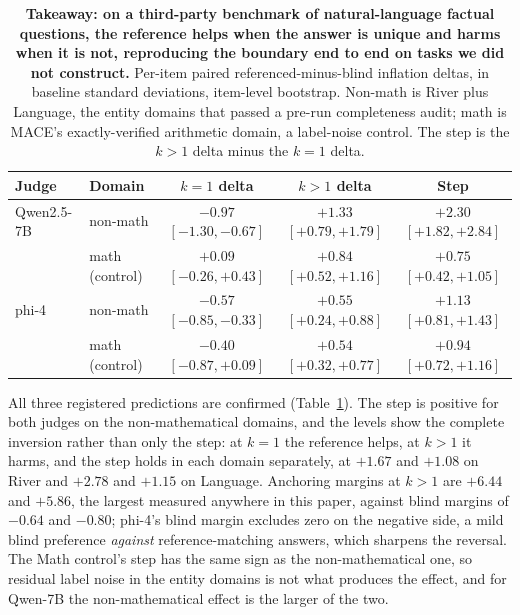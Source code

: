 \documentclass[11pt]{article}
\begin{document}
\begin{table}[tbp]
\centering
\small
\setlength{\tabcolsep}{5pt}
\begin{tabular}{llccc}
\toprule
Judge & Domain & $k{=}1$ delta & $k{>}1$ delta & Step \\
\midrule
Qwen2.5-7B & non-math & $\mathbf{-0.97}$ {\scriptsize$[-1.30,-0.67]$} & $\mathbf{+1.33}$ {\scriptsize$[+0.79,+1.79]$} & $\mathbf{+2.30}$ {\scriptsize$[+1.82,+2.84]$} \\
 & math (control) & $+0.09$ {\scriptsize$[-0.26,+0.43]$} & $+0.84$ {\scriptsize$[+0.52,+1.16]$} & $+0.75$ {\scriptsize$[+0.42,+1.05]$} \\
\addlinespace
phi-4 & non-math & $\mathbf{-0.57}$ {\scriptsize$[-0.85,-0.33]$} & $\mathbf{+0.55}$ {\scriptsize$[+0.24,+0.88]$} & $\mathbf{+1.13}$ {\scriptsize$[+0.81,+1.43]$} \\
 & math (control) & $-0.40$ {\scriptsize$[-0.87,+0.09]$} & $+0.54$ {\scriptsize$[+0.32,+0.77]$} & $+0.94$ {\scriptsize$[+0.72,+1.16]$} \\
\bottomrule
\end{tabular}
\caption{\textbf{Takeaway: on a third-party benchmark of natural-language factual questions, the reference helps when the answer is unique and harms when it is not, reproducing the boundary end to end on tasks we did not construct.}
Per-item paired referenced-minus-blind inflation deltas, in baseline standard deviations, item-level bootstrap. Non-math is River plus Language, the entity domains that passed a pre-run completeness audit; math is \textsc{MACE}'s exactly-verified arithmetic domain, a label-noise control. The step is the $k{>}1$ delta minus the $k{=}1$ delta.}
\label{tab:mace}
\end{table}

All three registered predictions are confirmed (Table~\ref{tab:mace}).
The step is positive for both judges on the non-mathematical domains, and the levels show the complete inversion rather than only the step: at $k{=}1$ the reference helps, at $k{>}1$ it harms, and the step holds in each domain separately, at $+1.67$ and $+1.08$ on River and $+2.78$ and $+1.15$ on Language.
Anchoring margins at $k{>}1$ are $+6.44$ and $+5.86$, the largest measured anywhere in this paper, against blind margins of $-0.64$ and $-0.80$; phi-4's blind margin excludes zero on the negative side, a mild blind preference \emph{against} reference-matching answers, which sharpens the reversal.
The Math control's step has the same sign as the non-mathematical one, so residual label noise in the entity domains is not what produces the effect, and for Qwen-7B the non-mathematical effect is the larger of the two.
\end{document}
